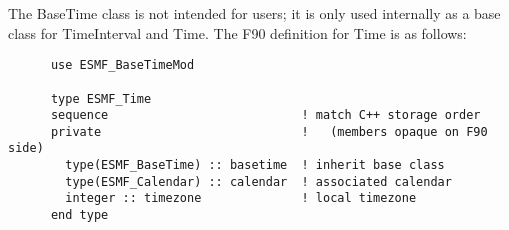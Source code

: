 
The BaseTime class is not intended for users; it is only used internally as a
base class for TimeInterval and Time.  The F90 definition for
Time is as follows:

\begin{verbatim}
      use ESMF_BaseTimeMod

      type ESMF_Time
      sequence                           ! match C++ storage order
      private                            !   (members opaque on F90 side)
        type(ESMF_BaseTime) :: basetime  ! inherit base class
        type(ESMF_Calendar) :: calendar  ! associated calendar
        integer :: timezone              ! local timezone
      end type
\end{verbatim}
